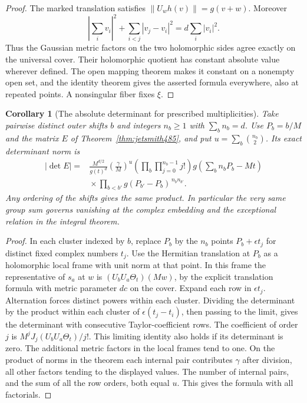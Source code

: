 \documentclass[a4paper,11pt]{article}
\newtheorem{corollary}[proposition]{Corollary}
\theoremstyle{definition}
\theoremstyle{remark}
\numberwithin{equation}{section}
\begin{document}
\begin{proof}
The marked translation satisfies
\(\|U_wh(v)\|=g(v+w)\). Moreover
\[
 \left|\sum_i v_i\right|^2+\sum_{i<j}|v_j-v_i|^2
                         =d\sum_i |v_i|^2 .
\]
Thus the Gaussian metric factors on the two holomorphic sides
agree exactly on the universal cover. Their holomorphic quotient
has constant absolute value wherever defined. The open mapping
theorem makes it constant on a nonempty open set, and the
identity theorem gives the asserted formula everywhere, also
at repeated points. A nonsingular fiber fixes \(\xi\).
\end{proof}

\begin{corollary}[The absolute determinant for prescribed multiplicities]\leavevmode
\label{cor:confluent486}
Take pairwise distinct outer shifts \(b\) and integers
\(n_b\ge1\) with \(\sum_b n_b=d\). Use \(P_b=b/M\) and the
matrix \(E\) of Theorem~\ref{thm:jetsmith485}, and put
\(u=\sum_b\binom{n_b}{2}\). Its exact determinant norm is
\[
 \begin{aligned}
 |\det E|
   ={}&\frac{M^{d/2}}{g(t)^d}
         \left(\frac{\gamma}{M}\right)^u
         \left(\prod_b\prod_{j=0}^{n_b-1}j!\right)
         g\!\left(\sum_b n_bP_b-Mt\right)\\
      &{}\times\prod_{b<b'}g(P_{b'}-P_b)^{\,n_bn_{b'}} .
 \end{aligned}
\]
Any ordering of the shifts gives the same product. In particular
the very same group sum governs vanishing at the complex
embedding and the exceptional relation in the integral theorem.
\end{corollary}
\begin{proof}
In each cluster indexed by \(b\), replace \(P_b\) by the \(n_b\)
points \(P_b+\epsilon t_j\) for distinct fixed complex numbers
\(t_j\). Use the Hermitian translation at \(P_b\) as a holomorphic
local frame with unit norm at that point. In this frame the
representative of \(s_a\) at \(w\) is
\((U_bU_a\Theta_t)(Mw)\), by the explicit translation formula
with metric parameter \(dc\) on the cover. Expand each row in
\(\epsilon t_j\). Alternation forces distinct powers within
each cluster. Dividing the determinant by the product within
each cluster of \(\epsilon(t_j-t_i)\), then passing to the
limit, gives the determinant with consecutive Taylor-coefficient
rows. The coefficient of order \(j\) is
\(M^j J_j(U_bU_a\Theta_t)/j!\). This limiting identity also
holds if its determinant is zero. The additional metric factors
in the local frames tend to one. On the product of norms in the
theorem each internal pair contributes \(\gamma\) after division,
all other factors tending to the displayed values. The number
of internal pairs, and the sum of all the row orders, both equal
\(u\). This gives the formula with all factorials.
\end{proof}
\end{document}
